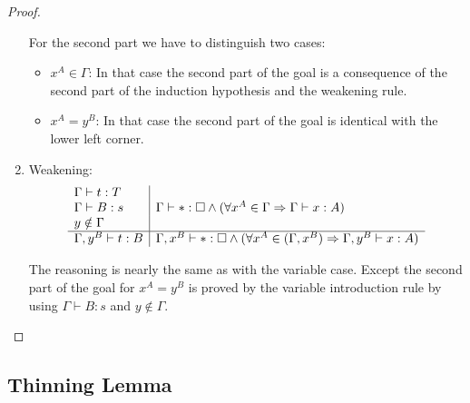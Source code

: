 \begin{theorem}
\begin{proof}
\begin{enumerate}
            For the second part we have to distinguish two cases:
            \begin{itemize}
            \item $x^A \in \Gamma$: In that case the second part of the goal is
                a consequence of the second part of the induction hypothesis and
                    the weakening rule.
            \item $x^A = y^B$: In that case the second part of the goal is
                identical with the lower left corner.
            \end{itemize}

        \item Weakening:
            $$
            \begin{array}{l|l}
                \Gamma \vdash t : T
                \\
                \Gamma \vdash B: s
                &
                \Gamma \vdash * : \Box
                \land
                (\forall x^A \in \Gamma \Rightarrow \Gamma \vdash x : A)
                \\
                y \notin \Gamma
                \\
                \hline
                \Gamma, y^B \vdash t: B
                &
                \Gamma, x^B \vdash *:\Box
                \land
                (\forall x^A \in (\Gamma, x^B) \Rightarrow \Gamma, y^B \vdash x : A)
            \end{array}
            $$

            The reasoning is nearly the same as with the variable case. Except
            the second part of the goal for $x^A = y^B$ is proved by the
            variable introduction rule by using $\Gamma \vdash B : s$ and $y
            \notin \Gamma$.
        \end{enumerate}
    \end{proof}
\end{theorem}



\subsection{Thinning Lemma}

